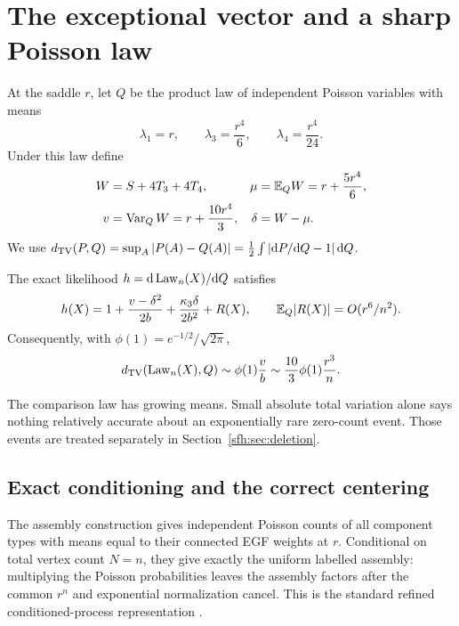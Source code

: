 \section{The exceptional vector and a sharp Poisson law}\label{sfh:sec:likelihood}
At the saddle $r$, let $Q$ be the product law of independent Poisson variables with means
\begin{equation}\label{sfh:eq:means}
 \lambda_1=r,\qquad \lambda_3=\frac{r^4}{6},\qquad
 \lambda_4=\frac{r^4}{24}.
\end{equation}
Under this law define
\begin{align}
 W&=S+4T_3+4T_4,& \mu&=\mathbb E_QW=r+\frac{5r^4}{6},\nonumber\\
 v&=\operatorname{Var}_QW=r+\frac{10r^4}{3},& \delta&=W-\mu.\label{sfh:eq:W}
\end{align}
We use $d_{\mathrm{TV}}(P,Q)=\sup_A|P(A)-Q(A)|=\tfrac12\int|\mathrm d P/\mathrm d Q-1|\,\mathrm d Q$.

\begin{theorem}\label{sfh:thm:TV}
The exact likelihood $h=\mathrm d\operatorname{Law}_n(X)/\mathrm d Q$ satisfies
\begin{equation}\label{sfh:eq:likelihood}
 h(X)=1+\frac{v-\delta^2}{2b}
          +\frac{\kappa_3\delta}{2b^2}+R(X),
 \qquad \mathbb E_Q|R(X)|=O(r^6/n^2).
\end{equation}
Consequently, with $\phi(1)=e^{-1/2}/\sqrt{2\pi}$,
\begin{equation}\label{sfh:eq:TV}
 d_{\mathrm{TV}}(\operatorname{Law}_n(X),Q)\sim\phi(1)\frac vb
       \sim\frac{10}{3}\phi(1)\frac{r^3}{n}.
\end{equation}
\end{theorem}
The comparison law has growing means. Small absolute total variation alone says nothing relatively accurate about an exponentially rare zero-count event. Those events are treated separately in Section~\ref{sfh:sec:deletion}.

\subsection{Exact conditioning and the correct centering}
The assembly construction gives independent Poisson counts of all component types with means equal to their connected EGF weights at $r$. Conditional on total vertex count $N=n$, they give exactly the uniform labelled assembly: multiplying the Poisson probabilities leaves the assembly factors after the common $r^n$ and exponential normalization cancel. This is the standard refined conditioned-process representation \cite[Sections 2--3 and 6]{arratia}.

